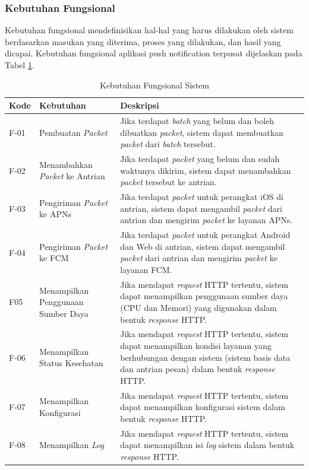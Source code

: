 \subsubsection{Kebutuhan Fungsional}
\par Kebutuhan fungsional mendefinisikan hal-hal yang harus dilakukan oleh sistem berdasarkan masukan yang diterima, proses yang dilakukan, dan hasil yang dicapai. Kebutuhan fungsional aplikasi push notification terpusat dijelaskan pada Tabel \ref{t:fungsional}.
\begin{longtable}{|p{1cm}|p{3cm}|p{5cm}|}
    \caption{Kebutuhan Fungsional Sistem} \label{t:fungsional} \\ \hline
    \rowcolor{lightgray} Kode & {Kebutuhan} & Deskripsi \\ \hline
    F-01 & Pembuatan \textit{Packet} & Jika terdapat \textit{batch} yang belum dan boleh dibuatkan \textit{packet}, sistem dapat membuatkan \textit{packet} dari \textit{batch} tersebut. \\ \hline
    F-02 & Menambahkan \textit{Packet} ke Antrian & Jika terdapat \textit{packet} yang belum dan sudah waktunya dikirim, sistem dapat menambahkan \textit{packet} tersebut ke antrian. \\ \hline
    F-03 & Pengiriman \textit{Packet} ke APNs & Jika terdapat \textit{packet} untuk perangkat iOS di antrian, sistem dapat mengambil \textit{packet} dari antrian dan mengirim \textit{packet} ke layanan APNs. \\ \hline
    F-04 & Pengiriman \textit{Packet} ke FCM & Jika terdapat \textit{packet} untuk perangkat Android dan Web di antrian, sistem dapat mengambil \textit{packet} dari antrian dan mengirim \textit{packet} ke layanan FCM. \\ \hline
    F05 & Menampilkan Penggunaan Sumber Daya & Jika mendapat \textit{request} HTTP tertentu, sistem dapat menampilkan penggunaan sumber daya (CPU dan Memori) yang digunakan dalam bentuk \textit{response} HTTP. \\ \hline
    F-06 & Menampilkan Status Kesehatan & Jika mendapat \textit{request} HTTP tertentu, sistem dapat menampilkan kondisi layanan yang berhubungan dengan sistem (sistem basis data dan antrian pesan) dalam bentuk \textit{response} HTTP. \\ \hline
    F-07 & Menampilkan Konfigurasi & Jika mendapat \textit{request} HTTP tertentu, sistem dapat menampilkan konfigurasi sistem dalam bentuk \textit{response} HTTP. \\ \hline
    F-08 & Menampilkan \textit{Log} & Jika mendapat \textit{request} HTTP tertentu, sistem dapat menampilkan isi \textit{log} sistem dalam bentuk \textit{response} HTTP. \\ \hline
\end{longtable}

